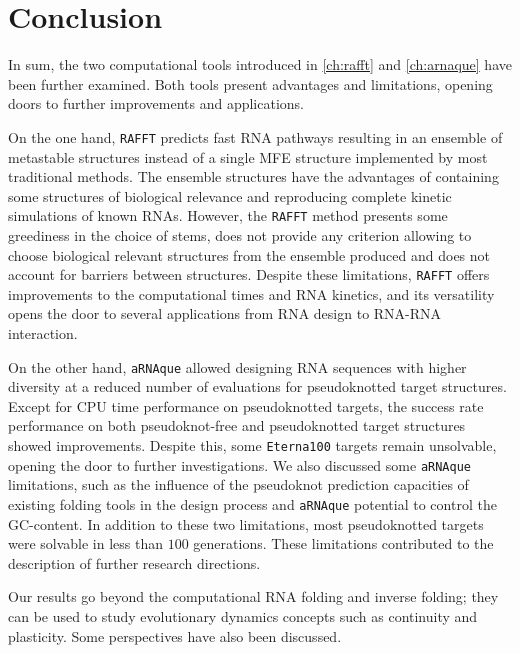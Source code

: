 \section{Conclusion}

In sum, the two computational tools introduced in \autoref{ch:rafft} and \autoref{ch:arnaque} have been further examined. Both tools present advantages and limitations, opening doors to further improvements and applications. 

On the one hand, \texttt{RAFFT} predicts fast \ac{RNA} pathways resulting in an ensemble of metastable structures instead of a single \ac{MFE} structure implemented by most traditional methods. The ensemble structures have the advantages of containing some structures of biological relevance and reproducing complete kinetic simulations of known \acp{RNA}. However, the \texttt{RAFFT} method presents some greediness in the choice of stems, does not provide any criterion allowing to choose biological relevant structures from the ensemble produced and does not account for barriers between structures. Despite these limitations, \texttt{RAFFT} offers improvements to the computational times and \ac{RNA} kinetics, and its versatility opens the door to several applications from \ac{RNA} design to \ac{RNA}-\ac{RNA} interaction. 

On the other hand, \texttt{aRNAque} allowed designing \ac{RNA} sequences with higher diversity at a reduced number of evaluations for pseudoknotted target structures. Except for \ac{CPU} time performance on pseudoknotted targets, the success rate performance on both pseudoknot-free and pseudoknotted target structures showed improvements. Despite this, some \texttt{Eterna100} targets remain unsolvable, opening the door to further investigations. We also discussed some \texttt{aRNAque} limitations, such as the influence of the pseudoknot prediction capacities of existing folding tools in the design process and \texttt{aRNAque} potential to control the GC-content. In addition to these two limitations, most pseudoknotted targets were solvable in less than $100$ generations. These limitations contributed to the description of further research directions.

Our results go beyond the computational \ac{RNA} folding and inverse folding; they can be used to study evolutionary dynamics concepts such as continuity and plasticity. Some perspectives have also been discussed.


